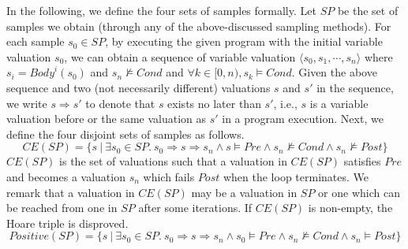 \noindent
In the following, we define the four sets of samples formally. Let $\mathit{SP}$ be the set of samples we obtain (through any of the above-discussed sampling methods). For each sample $s_0 \in \mathit{SP}$, by executing the given program with the initial variable valuation $s_0$, we can obtain a sequence of variable valuation $\langle s_0, s_1, \cdots, s_n \rangle$ where $s_i = \mathit{Body}^i(s_0)$ and $s_n \not \models \mathit{Cond}$ and $\forall k \in [0, n), s_k \models \mathit{Cond}$. Given the above sequence and two (not necessarily different) valuations $s$ and $s'$ in the sequence, we write $s \Rightarrow s'$ to denote that $s$ exists no later than $s'$, i.e., $s$ is a variable valuation before or the same valuation as $s'$ in a program execution.
Next, we define the four disjoint sets of samples as follows.
\[
\mathit{CE}(\mathit{SP}) = \{s~|~\exists s_0 \in \mathit{SP}.~s_0 \Rightarrow s \Rightarrow s_n \land s \models \mathit{Pre} \land s_n \not \models \mathit{Cond} \land s_n \not \models \mathit{Post}\} \]
$\mathit{CE(SP)}$ is the set of valuations such that a valuation in $\mathit{CE(SP)}$ satisfies $\mathit{Pre}$ and becomes a valuation $s_n$ which fails $\mathit{Post}$ when the loop terminates. We remark that a valuation in $\mathit{CE(SP)}$ may be a valuation in $\mathit{SP}$ or one which can be reached from one in $\mathit{SP}$ after some iterations. If $\mathit{CE}(\mathit{SP})$ is non-empty, the Hoare triple is disproved.
\[
\mathit{Positive}(\mathit{SP}) = \{s~|~\exists s_0 \in \mathit{SP}.~s_0 \Rightarrow s \Rightarrow s_n \land s_0 \models \mathit{Pre} \land s_n \not \models \mathit{Cond} \land s_n \models \mathit{Post}\}\]
